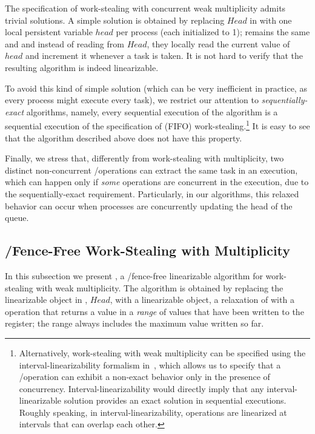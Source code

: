 The specification of work-stealing with concurrent weak multiplicity admits trivial solutions.  A simple solution is obtained by replacing \(Head\) in \WFWSM with one local persistent variable \(head\) per process (each initialized to 1); \Put remains the same and \Take and \Steal instead of reading from \(Head\), they locally read the current value of \(head\) and increment it whenever a task is taken. It is not hard to verify that the resulting algorithm is indeed linearizable.

To avoid this kind of simple solution (which can be very inefficient in practice, as every process might execute every task), we restrict our attention to \textit{sequentially-exact} algorithms, namely, every sequential execution of the algorithm is a sequential execution of the specification of (FIFO) work-stealing.\footnote{Alternatively, work-stealing with weak multiplicity can be specified using the interval-linearizability formalism in~\cite{DBLP_journals_jacm_CastanedaRR18}, which allows us to specify that a \Take/\Steal operation can exhibit a non-exact behavior only in the presence of concurrency. Interval-linearizability would directly imply that any interval-linearizable solution provides an exact solution in sequential executions.  Roughly speaking, in interval-linearizability, operations are linearized at intervals that can overlap each other.}  It is easy to see that the algorithm described above does not have this property.

Finally, we stress that, differently from work-stealing with multiplicity, two distinct non-concurrent \Take/\Steal operations can extract the same task in an execution, which can happen only if \emph{some} operations are concurrent in the execution, due to the sequentially-exact requirement.  Particularly, in our algorithms, this relaxed behavior can occur when processes are concurrently updating the head of the queue.


\subsection{\label{sec-ws-mult-read-write}\R/\W Fence-Free Work-Stealing with Multiplicity}


In this subsection we present \NCWSM, a \R/\W fence-free linearizable algorithm for work-stealing with weak multiplicity.  The algorithm is obtained by replacing the linearizable \MaxReg object in \WFWSM, $Head$, with a linearizable \RangeMaxReg object, a relaxation of \MaxReg with a \RMaxR operation that returns a value in a \emph{range} of values that have been written to the register; the range always includes the maximum value written so far.


